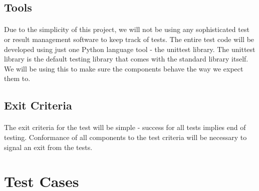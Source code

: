 \subsection{Tools}
\paragraph{}
Due to the simplicity of this project, we will not be using any sophisticated test or result management software to keep track of tests. The entire test code will be developed using just one Python language tool - the unittest library. The unittest library is the default testing library that comes with the standard library itself. We will be using this to make sure the components behave the way we expect them to.

\subsection{Exit Criteria}
\paragraph{}
The exit criteria for the test will be simple - success for all tests implies end of testing. Conformance of all components to the test criteria will be necessary to signal an exit from the tests.

\newpage
\section{Test Cases}
\begin{comment}
\begin{tabular}{|p{4cm}|p{9cm}|}
\hline
Module & <module\#> \\
\hline
Unit name & <name of unit> \\
\hline
Preconditions & <preconditions> \\
\hline
Test Steps & \begin{enumerate}
\item <first step>
\item <second step>
\end{enumerate}\\
\hline
Expected Results & <expected results> \\
\hline
\end{tabular}
\\
\end{comment}

